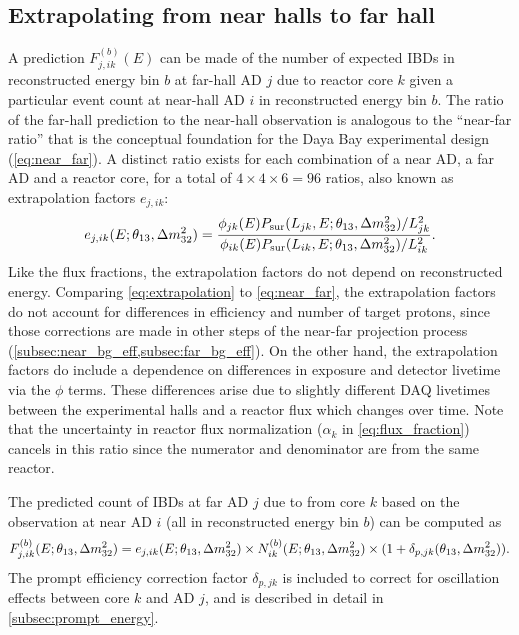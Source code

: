 \subsection{Extrapolating from near halls to far hall}
\label{subsec:extrapolation}

A prediction $F_{j,ik}^{(b)}(E)$ can be made of the number of expected IBDs
in reconstructed energy bin $b$
at far-hall AD $j$ due to reactor core $k$
given a particular event count at near-hall AD $i$ in reconstructed energy bin $b$.
The ratio of the far-hall prediction to the near-hall observation
is analogous to the ``near-far ratio''
that is the conceptual foundation
for the Daya Bay experimental design (\cref{eq:near_far}).
A distinct ratio exists for each combination of a near AD, a far AD and a reactor core,
for a total of $4 \times 4 \times 6 = 96$ ratios, also known as extrapolation factors
$e_{j,ik}$:
\begin{equation}\label{eq:extrapolation}
    e_{j,ik}(E;\theta_{13},\Delta m^2_{32}) = \frac{
        \phi_{jk}(E)P_\text{sur}(L_{jk}, E;\theta_{13},\Delta m^2_{32})/L_{jk}^2}{
        \phi_{ik}(E)P_\text{sur}(L_{ik}, E;\theta_{13},\Delta m^2_{32})/L_{ik}^2
    }.
\end{equation}
Like the flux fractions, the extrapolation factors
do not depend on reconstructed energy.
Comparing \cref{eq:extrapolation} to \cref{eq:near_far}, the extrapolation factors
do not account for differences in efficiency and number of target protons,
since those corrections are made in other steps of the near-far projection process
(\cref{subsec:near_bg_eff,subsec:far_bg_eff}).
On the other hand, the extrapolation factors do include a dependence on
differences in \nuebar{} exposure and detector livetime via the $\phi$ terms.
These differences arise due to slightly different DAQ livetimes
between the experimental halls
and a reactor flux which changes over time.
Note that the uncertainty in reactor flux normalization
($\alpha_k$ in \cref{eq:flux_fraction})
cancels in this ratio since the numerator and denominator are from the same reactor.

The predicted count of IBDs at far AD $j$ due to \nuebar{} from core $k$
based on the observation at near AD $i$ (all in reconstructed energy bin $b$) can be computed as
\begin{equation}\label{eq:far_true_core_pred}
    F_{j,ik}^{(b)}(E;\theta_{13},\Delta m^2_{32}) = e_{j,ik}(E;\theta_{13},\Delta m^2_{32}) \times
        N_{ik}^{(b)}(E;\theta_{13},\Delta m^2_{32}) \times
        (1 + \delta_{p,jk}(\theta_{13}, \Delta m^2_{32})).
\end{equation}
The prompt efficiency correction factor $\delta_{p,jk}$ is included
to correct for oscillation effects between core $k$ and AD $j$,
and is described in detail in \cref{subsec:prompt_energy}.

